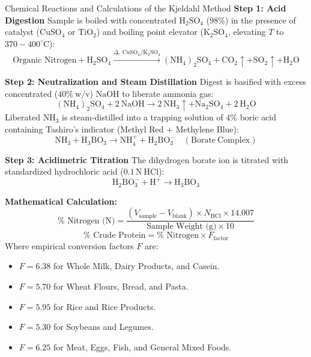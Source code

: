 \documentclass[11pt,a4paper,oneside]{article}
\begin{document}
\begin{formulabox}{Chemical Reactions and Calculations of the Kjeldahl Method}
\textbf{Step 1: Acid Digestion}
Sample is boiled with concentrated $\mathrm{H_2SO_4}$ ($98\%$) in the presence of catalyst ($\mathrm{CuSO_4}$ or $\mathrm{TiO_2}$) and boiling point elevator ($\mathrm{K_2SO_4}$, elevating $T$ to $370-400^\circ\text{C}$):
$$\text{Organic Nitrogen} + \mathrm{H_2SO_4} \xrightarrow{\Delta,\ \mathrm{CuSO_4/K_2SO_4}} \mathrm{(NH_4)_2SO_4 + CO_2\uparrow + SO_2\uparrow + H_2O}$$

\textbf{Step 2: Neutralization and Steam Distillation}
Digest is basified with excess concentrated ($40\%\ \text{w/v}$) $\mathrm{NaOH}$ to liberate ammonia gas:
$$\mathrm{(NH_4)_2SO_4 + 2\ NaOH \longrightarrow 2\ NH_3\uparrow + Na_2SO_4 + 2\ H_2O}$$
Liberated $\mathrm{NH_3}$ is steam-distilled into a trapping solution of $4\%$ boric acid containing Tashiro's indicator (Methyl Red + Methylene Blue):
$$\mathrm{NH_3 + H_3BO_3 \longrightarrow NH_4^+ + H_2BO_3^- \quad (Borate\ Complex)}$$

\textbf{Step 3: Acidimetric Titration}
The dihydrogen borate ion is titrated with standardized hydrochloric acid ($0.1\,\mathrm{N}\ \mathrm{HCl}$):
$$\mathrm{H_2BO_3^- + H^+ \longrightarrow H_3BO_3}$$

\textbf{Mathematical Calculation:}
$$\% \text{ Nitrogen (N)} = \frac{(V_{\text{sample}} - V_{\text{blank}}) \times N_{\mathrm{HCl}} \times 14.007}{\text{Sample Weight (g)} \times 10}$$
$$\% \text{ Crude Protein} = \% \text{ Nitrogen} \times F_{\text{factor}}$$
Where empirical conversion factors $F$ are:
\begin{itemize}
    \item $F = 6.38$ for Whole Milk, Dairy Products, and Casein.
    \item $F = 5.70$ for Wheat Flours, Bread, and Pasta.
    \item $F = 5.95$ for Rice and Rice Products.
    \item $F = 5.30$ for Soybeans and Legumes.
    \item $F = 6.25$ for Meat, Eggs, Fish, and General Mixed Foods.
\end{itemize}
\end{formulabox}
\end{document}
